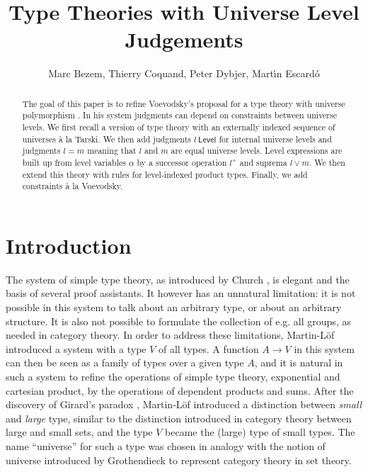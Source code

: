 \documentclass[11pt,a4paper]{article}
\theoremstyle{definition}
\newcommand{\Level}{\mathsf{Level}}
\begin{document}
\title{Type Theories with Universe Level Judgements}

\author{Marc Bezem, Thierry Coquand, Peter Dybjer, Mart\'{\i}n Escard\'o}
\date{}
\maketitle

\begin{abstract}

  The goal of this paper is to refine Voevodsky's proposal for a type
  theory with universe polymorphism \cite{VV}. In his system judgments
  can depend on constraints between universe levels. We first recall a
  version of type theory with an externally indexed sequence of
  universes \`a la Tarski. We then add judgments $l\ \Level$ for internal
  universe levels and judgments $l = m$ meaning that $l$ and $m$ are equal
  universe levels. Level expressions are built up from level
  variables $\alpha$ by a successor operation $l^+$ and suprema
  $l \vee m$.  We then extend this theory with rules for level-indexed
  product types.  Finally, we add constraints \`a la Voevodsky.

\end{abstract}


\section{Introduction}\label{sec:intros}

The system of simple type theory, as introduced by Church \cite{church:formulation},
is elegant and the basis of several
proof assistants. It however has an unnatural limitation: it is not possible in this system to talk
about an arbitrary type, or about an arbitrary structure. It is also not possible to formulate the collection
of e.g. all groups, as needed in category theory. In order to address these limitations, Martin-L\"of
\cite{ML71,ML71a} introduced a system with a type $V$ of all types. A function $A\rightarrow V$ in this system can
then be seen as a family of types over a given type $A$, and it is natural in such a system to refine
the operations of simple type theory, exponential and cartesian product, by the operations of dependent products
and sums. After the discovery of Girard's paradox \cite{Girard71}, Martin-L\"of \cite{ML72}
introduced a distinction between
{\em small} and {\em large} type, similar to the distinction introduced in category theory between large and small sets,
and the type $V$ became the (large) type of small types.
The name ``universe'' for such a type was chosen
in analogy with the notion of universe introduced by Grothendieck to represent category theory
in set theory.
\end{document}
